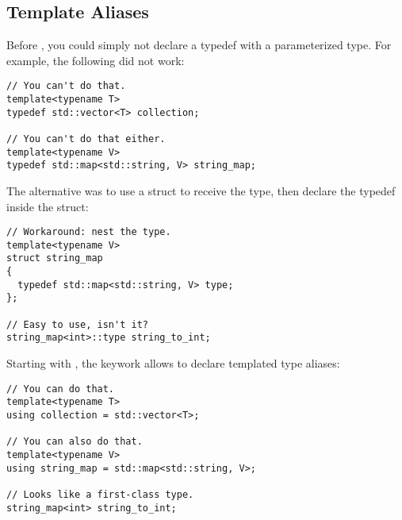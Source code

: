 \subsection{Template Aliases}

Before , you could simply not declare a typedef with a
parameterized type. For example, the following did not work:

\begin{lstlisting}
// You can't do that.
template<typename T>
typedef std::vector<T> collection;

// You can't do that either.
template<typename V>
typedef std::map<std::string, V> string_map;
\end{lstlisting}

The alternative was to use a struct to receive the type, then declare
the typedef inside the struct:

\begin{lstlisting}
// Workaround: nest the type.
template<typename V>
struct string_map
{
  typedef std::map<std::string, V> type;
};

// Easy to use, isn't it?
string_map<int>::type string_to_int;
\end{lstlisting}

Starting with , the  keywork allows to declare
templated type aliases:

\begin{lstlisting}
// You can do that.
template<typename T>
using collection = std::vector<T>;

// You can also do that.
template<typename V>
using string_map = std::map<std::string, V>;

// Looks like a first-class type.
string_map<int> string_to_int;
\end{lstlisting}
